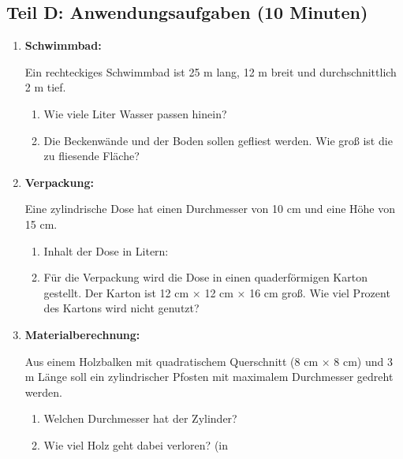 \subsection*{Teil D: Anwendungsaufgaben (10 Minuten)}

\begin{enumerate}[label=\arabic*.,resume]

    \item \textbf{Schwimmbad:}

    Ein rechteckiges Schwimmbad ist 25 m lang, 12 m breit und durchschnittlich 2 m tief.

    \begin{enumerate}[label=\alph*)]
        \item Wie viele Liter Wasser passen hinein?

        \vspace{2cm}

        \item Die Beckenwände und der Boden sollen gefliest werden. Wie groß ist die zu fliesende Fläche?

        \vspace{2.5cm}

    \end{enumerate}

    \item \textbf{Verpackung:}

    Eine zylindrische Dose hat einen Durchmesser von 10 cm und eine Höhe von 15 cm.

    \begin{enumerate}[label=\alph*)]
        \item Inhalt der Dose in Litern:

        \vspace{2cm}

        \item Für die Verpackung wird die Dose in einen quaderförmigen Karton gestellt. Der Karton ist 12 cm × 12 cm × 16 cm groß. Wie viel Prozent des Kartons wird nicht genutzt?

        \vspace{3cm}

    \end{enumerate}

    \item \textbf{Materialberechnung:}

    Aus einem Holzbalken mit quadratischem Querschnitt (8 cm × 8 cm) und 3 m Länge soll ein zylindrischer Pfosten mit maximalem Durchmesser gedreht werden.

    \begin{enumerate}[label=\alph*)]
        \item Welchen Durchmesser hat der Zylinder?

        \vspace{2cm}

        \item Wie viel Holz geht dabei verloren? (in %

        \vspace{2.5cm}

    \end{enumerate}

\end{enumerate}